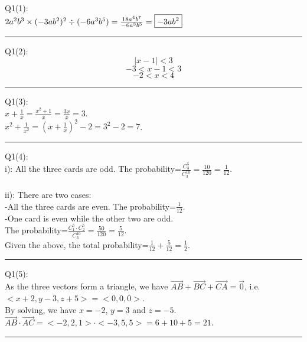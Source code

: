 \documentclass{article}
\begin{document}
\noindent Q1(1):\\
$2a^2b^3\times(-3ab^2)^2\div(-6a^3b^5)\\
=\frac{18a^4b^7}{-6a^3b^5}\\
=\boxed{-3ab^2}$

\vspace{1cm}
\hrule
\vspace{1cm}

\noindent Q1(2):\\
$$|x-1|<3$$
$$-3<x-1<3$$
$$\boxed{-2}<x<\boxed4$$

\vspace{1cm}
\hrule
\vspace{1cm}

\noindent Q1(3):\\
$x+\frac{1}{x}=\frac{x^2+1}{x}=\frac{3x}{x}=\boxed3$.\\
$x^2+\frac{1}{x^2}=(x+\frac{1}{x})^2-2=3^2-2=\boxed7$.

\vspace{1cm}
\hrule
\vspace{1cm}

\noindent Q1(4):\\
i): All the three cards are odd. The probability=$\frac{C_3^5}{C_3^{10}}=\frac{10}{120}=\frac{1}{\boxed{12}}$.\\
\\
ii): There are two cases:\\
-All the three cards are even. The probability=$\frac{1}{12}$.\\
-One card is even while the other two are odd. \\
The probability=$\frac{C_1^5\cdot C_2^5}{C_3^{10}}=\frac{50}{120}=\frac{5}{12}$.\\
Given the above, the total probability=$\frac{1}{12}+\frac{5}{12}=\frac{1}{\boxed2}$.

\vspace{1cm}
\hrule
\vspace{1cm}

\noindent Q1(5):\\
As the three vectors form a triangle, we have $\vec{AB}+\vec{BC}+\vec{CA}=\vec{0}$, i.e. $<x+2,y-3,z+5>=<0,0,0>$.\\
By solving, we have $x=\boxed{-2}$, $y=\boxed3$ and $z=\boxed{-5}$.\\
$\vec{AB}\cdot\vec{AC}=<-2,2,1>\cdot<-3,5,5>=6+10+5=\boxed{21}$.

\vspace{1cm}
\hrule
\vspace{1cm}
\end{document}
